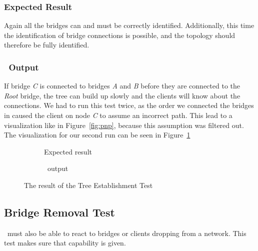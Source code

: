 \subsubsection*{Expected Result}
Again all the bridges can and must be correctly identified.
Additionally, this time the identification of bridge connections is possible, and the topology should therefore be fully identified.

\subsubsection*{\tool\ Output}
If bridge \textit{C} is connected to bridges \textit{A} and \textit{B} before they are connected to the \textit{Root} bridge, the tree can build up slowly and the clients will know about the connections.
We had to run this test twice, as the order we connected the bridges in caused the client on node \textit{C} to assume an incorrect path.
This lead to a visualization like in Figure~\ref{fig:pnp}, because this assumption was filtered out.
The visualization for our second run can be seen in Figure~\ref{fig:est}
\begin{figure}[h]
    \begin{subfigure}[b]{\textwidth}
        \centering
            \caption{Expected result}
    \end{subfigure}

    \vspace{0.5cm}

    \begin{subfigure}[b]{\textwidth}
        \centering
        
        \caption{\tool\ output}
    \end{subfigure}
    \caption{The result of the Tree Establishment Test}
    \label{fig:est}
\end{figure}

\subsection*{Bridge Removal Test}
\label{removal_test}
\tool\ must also be able to react to bridges or clients dropping from a network.
This test makes sure that capability is given.

